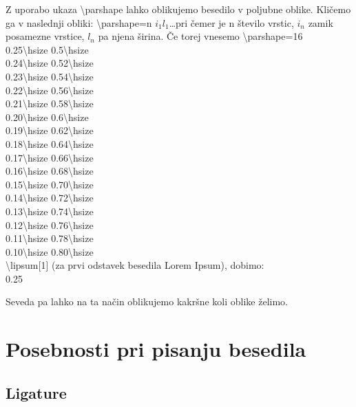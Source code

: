 \documentclass[a4paper]{book}
\newcommand\tbs{\textbackslash{}}
\begin{document}
Z uporabo ukaza \tbs{}parshape lahko oblikujemo besedilo v poljubne oblike. Kličemo ga v naslednji obliki: \tbs{}parshape=n $i_1 l_1$\ldots pri čemer je n število vrstic, $i_n$ zamik posamezne vrstice, $l_n$ pa njena širina.
Če torej vnesemo 
\tbs{}parshape=16 \\ 
0.25\tbs{}hsize 0.5\tbs{}hsize \\ 
0.24\tbs{}hsize 0.52\tbs{}hsize \\ 
0.23\tbs{}hsize 0.54\tbs{}hsize \\ 
0.22\tbs{}hsize 0.56\tbs{}hsize \\ 
0.21\tbs{}hsize 0.58\tbs{}hsize \\ 
0.20\tbs{}hsize 0.6\tbs{}hsize \\ 
0.19\tbs{}hsize 0.62\tbs{}hsize \\ 
0.18\tbs{}hsize 0.64\tbs{}hsize \\ 
0.17\tbs{}hsize 0.66\tbs{}hsize \\ 
0.16\tbs{}hsize 0.68\tbs{}hsize \\ 
0.15\tbs{}hsize 0.70\tbs{}hsize \\
0.14\tbs{}hsize 0.72\tbs{}hsize \\
0.13\tbs{}hsize 0.74\tbs{}hsize \\
0.12\tbs{}hsize 0.76\tbs{}hsize \\
0.11\tbs{}hsize 0.78\tbs{}hsize \\
0.10\tbs{}hsize 0.80\tbs{}hsize \\
\tbs{}lipsum[1] (za prvi odstavek besedila Lorem Ipsum), dobimo:\\

0.25\hsize
\noindent\lipsum[1]

Seveda pa lahko na ta način oblikujemo kakršne koli oblike želimo.


\section{Posebnosti pri pisanju besedila}

\subsection{Ligature}
\end{document}
